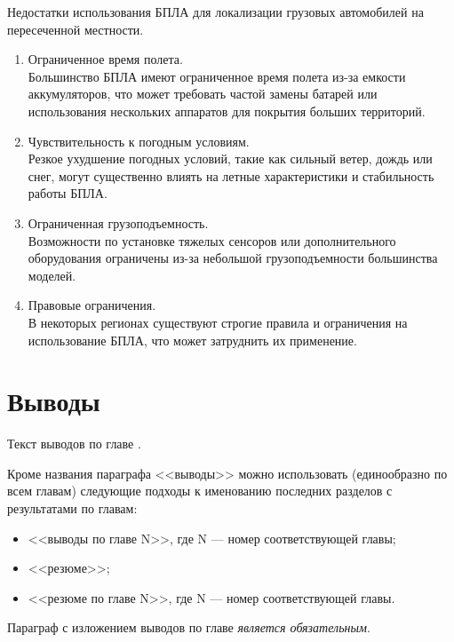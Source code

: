 Недостатки использования БПЛА для локализации грузовых автомобилей на пересеченной местности. 
\begin{enumerate}
    \item Ограниченное время полета. \\
Большинство БПЛА имеют ограниченное время полета из-за емкости аккумуляторов, что может требовать частой замены батарей или использования нескольких аппаратов для покрытия больших территорий.
\item Чувствительность к погодным условиям. \\
Резкое ухудшение погодных условий, такие как сильный ветер, дождь или снег, могут существенно влиять на летные характеристики и стабильность работы БПЛА.
\item Ограниченная грузоподъемность. \\
Возможности по установке тяжелых сенсоров или дополнительного оборудования ограничены из-за небольшой грузоподъемности большинства моделей.
\item Правовые ограничения. \\
В некоторых регионах существуют строгие правила и ограничения на использование БПЛА, что может затруднить их применение.
\end{enumerate}


\section{Выводы} \label{ch1:conclusion}

Текст выводов по главе \thechapter.

Кроме названия параграфа <<выводы>> можно использовать (единообразно по всем главам) следующие подходы к именованию последних разделов с результатами по главам:
\begin{itemize}
	\item <<выводы по главе N>>, где N --- номер соответствующей главы;
	\item <<резюме>>;
	\item <<резюме по главе N>>, где N --- номер соответствующей главы.
\end{itemize}

Параграф с изложением выводов по главе \textit{является обязательным}.

%
